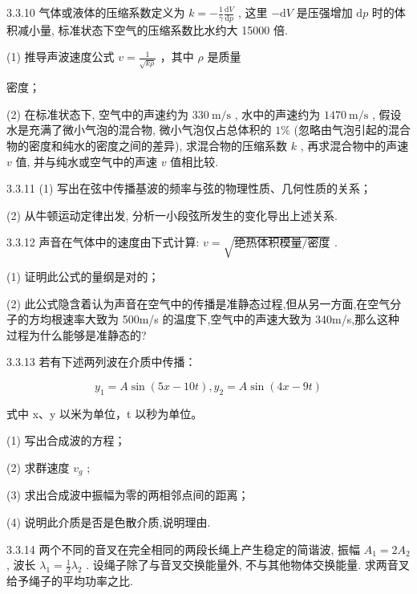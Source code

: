 \begin{problem}{3.3.10}
气体或液体的压缩系数定义为 $k = -\frac{1}{\gamma} \frac{\mathrm{d}V}{\mathrm{d}p}$ , 这里 $-\mathrm{d}V$ 是压强增加 $\mathrm{d}p$ 时的体积减小量, 标准状态下空气的压缩系数比水约大 15000 倍.

(1) 推导声波速度公式 $v=\frac{1}{\sqrt{k\rho}}$ ，其中 $\rho$ 是质量

密度；

(2) 在标准状态下, 空气中的声速约为 $330 \mathrm{~m} / \mathrm{s}$ , 水中的声速约为 $1470 \mathrm{~m} / \mathrm{s}$ , 假设水是充满了微小气泡的混合物, 微小气泡仅占总体积的 $1 \%$ (忽略由气泡引起的混合物的密度和纯水的密度之间的差异), 求混合物的压缩系数 $k$ , 再求混合物中的声速 $v$ 值, 并与纯水或空气中的声速 $v$ 值相比较.
\end{problem}
\clearpage


\begin{problem}{3.3.11}
(1) 写出在弦中传播基波的频率与弦的物理性质、几何性质的关系；

(2) 从牛顿运动定律出发, 分析一小段弦所发生的变化导出上述关系.
\end{problem}
\clearpage


\begin{problem}{3.3.12}
声音在气体中的速度由下式计算: $v = \sqrt{\text{绝热体积模量/密度}}$ .

(1) 证明此公式的量纲是对的；

(2) 此公式隐含着认为声音在空气中的传播是准静态过程,但从另一方面,在空气分子的方均根速率大致为 500m/s 的温度下,空气中的声速大致为 340m/s,那么这种过程为什么能够是准静态的?
\end{problem}
\clearpage


\begin{problem}{3.3.13}
若有下述两列波在介质中传播：

\[
y _ {1} = A \sin (5 x - 1 0 t), y _ {2} = A \sin (4 x - 9 t)
\]

式中 x、y 以米为单位，t 以秒为单位。

(1) 写出合成波的方程；

(2) 求群速度 $v_{g}$ ;

(3) 求出合成波中振幅为零的两相邻点间的距离；

(4) 说明此介质是否是色散介质,说明理由.
\end{problem}
\clearpage


\begin{problem}{3.3.14}
两个不同的音叉在完全相同的两段长绳上产生稳定的简谐波, 振幅 $A_{1} = 2A_{2}$ , 波长 $\lambda_{1} = \frac{1}{2}\lambda_{2}$ . 设绳子除了与音叉交换能量外, 不与其他物体交换能量. 求两音叉给予绳子的平均功率之比.
\end{problem}
\clearpage


